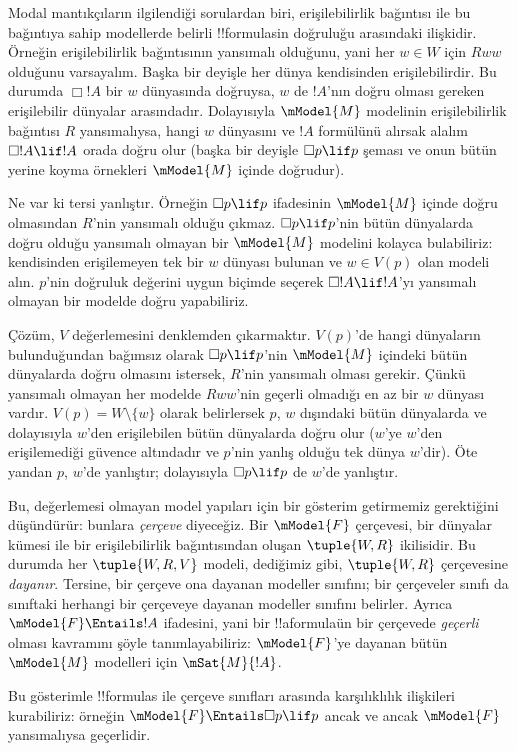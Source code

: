 



Modal mantıkçıların ilgilendiği sorulardan biri, erişilebilirlik bağıntısı ile
bu bağıntıya sahip modellerde belirli !!{formula}s{}in doğruluğu arasındaki
ilişkidir. Örneğin erişilebilirlik bağıntısının yansımalı olduğunu, yani her
$w\in W$ için $Rww$ olduğunu varsayalım. Başka bir deyişle her dünya
kendisinden erişilebilirdir. Bu durumda $\Box !A$ bir $w$ dünyasında
doğruysa, $w$ de $!A$'nın doğru olması gereken erişilebilir dünyalar
arasındadır. Dolayısıyla $\mModel{M}$ modelinin erişilebilirlik bağıntısı $R$
yansımalıysa, hangi $w$ dünyasını ve $!A$ formülünü alırsak alalım $\Box !A
\lif !A$ orada doğru olur (başka bir deyişle $\Box p\lif p$ şeması ve onun
bütün yerine koyma örnekleri $\mModel{M}$ içinde doğrudur).

Ne var ki tersi yanlıştır. Örneğin $\Box p\lif p$ ifadesinin
$\mModel{M}$ içinde doğru olmasından $R$'nin yansımalı olduğu çıkmaz.
$\Box p\lif p$'nin bütün dünyalarda doğru olduğu yansımalı olmayan bir
$\mModel{M}$ modelini kolayca bulabiliriz: kendisinden erişilemeyen tek bir
$w$ dünyası bulunan ve $w\in V(p)$ olan modeli alın. $p$'nin doğruluk
değerini uygun biçimde seçerek $\Box !A\lif !A$'yı yansımalı olmayan bir
modelde doğru yapabiliriz.

Çözüm, $V$ değerlemesini denklemden çıkarmaktır. $V(p)$'de hangi
dünyaların bulunduğundan bağımsız olarak $\Box p\lif p$'nin
$\mModel{M}$ içindeki bütün dünyalarda doğru olmasını istersek, $R$'nin
yansımalı olması gerekir. Çünkü yansımalı olmayan her modelde $Rww$'nin
geçerli olmadığı en az bir $w$ dünyası vardır. $V(p)=W\setminus\{w\}$
olarak belirlersek $p$, $w$ dışındaki bütün dünyalarda ve dolayısıyla
$w$'den erişilebilen bütün dünyalarda doğru olur ($w$'ye $w$'den
erişilemediği güvence altındadır ve $p$'nin yanlış olduğu tek dünya $w$'dir).
Öte yandan $p$, $w$'de yanlıştır; dolayısıyla $\Box p\lif p$ de $w$'de
yanlıştır.

Bu, değerlemesi olmayan model yapıları için bir gösterim getirmemiz
gerektiğini düşündürür: bunlara \emph{çerçeve} diyeceğiz. Bir
$\mModel{F}$ çerçevesi, bir dünyalar kümesi ile bir erişilebilirlik
bağıntısından oluşan $\tuple{W,R}$ ikilisidir. Bu durumda her
$\tuple{W,R,V}$ modeli, dediğimiz gibi, $\tuple{W,R}$ çerçevesine
\emph{dayanır}. Tersine, bir çerçeve ona dayanan modeller sınıfını; bir
çerçeveler sınıfı da sınıftaki herhangi bir çerçeveye dayanan modeller
sınıfını belirler. Ayrıca $\mModel{F}\Entails !A$ ifadesini, yani bir
!!a{formula}{}ün bir çerçevede \emph{geçerli} olması kavramını şöyle
tanımlayabiliriz: $\mModel{F}$'ye dayanan bütün $\mModel{M}$ modelleri
için $\mSat{M}{!A}$.

Bu gösterimle !!{formula}s ile çerçeve sınıfları arasında karşılıklılık
ilişkileri kurabiliriz: örneğin $\mModel{F}\Entails\Box p\lif p$ ancak ve
ancak $\mModel{F}$ yansımalıysa geçerlidir.

